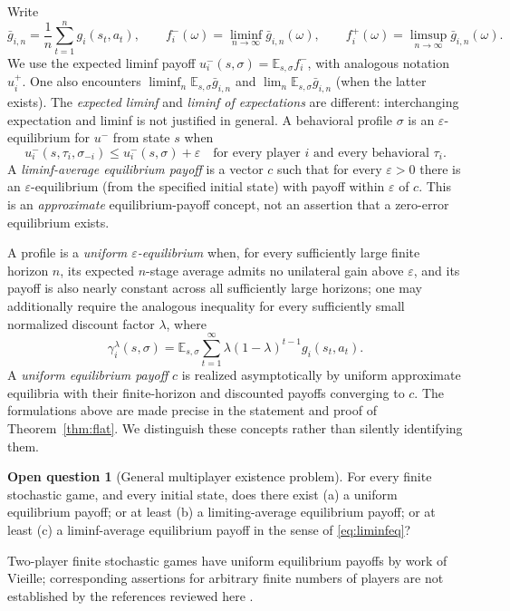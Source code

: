 \documentclass[11pt,a4paper]{article}
\numberwithin{equation}{section}
\theoremstyle{definition}
\newtheorem{question}[theorem]{Open question}
\theoremstyle{remark}
\newcommand{\E}{\mathbb E}
\newcommand{\sig}{\sigma}
\newcommand{\eps}{\varepsilon}
\begin{document}
Write
\[
\bar g_{i,n}=\frac1n\sum_{t=1}^n g_i(s_t,a_t),\qquad
f_i^-(\omega)=\liminf_{n\to\infty}\bar g_{i,n}(\omega),\qquad
f_i^+(\omega)=\limsup_{n\to\infty}\bar g_{i,n}(\omega).
\]
We use the expected liminf payoff
$u_i^-(s,\sig)=\E_{s,\sig}f_i^-$, with analogous notation $u_i^+$.
One also encounters $\liminf_n\E_{s,\sig}\bar g_{i,n}$ and
$\lim_n\E_{s,\sig}\bar g_{i,n}$ (when the latter exists).
The \emph{expected liminf} and \emph{liminf of expectations} are different:
interchanging expectation and liminf is not justified in general.
A behavioral profile $\sig$ is an $\eps$-equilibrium for $u^-$ from state
$s$ when
\begin{equation}\label{eq:liminfeq}
 u_i^-(s,\tau_i,\sig_{-i})\le u_i^-(s,\sig)+\eps
 \quad\text{for every player }i\text{ and every behavioral }\tau_i.
\end{equation}
A \emph{liminf-average equilibrium payoff} is a vector $c$ such that for
every $\eps>0$ there is an $\eps$-equilibrium (from the specified initial
state) with payoff within $\eps$ of $c$. This is an \emph{approximate}
equilibrium-payoff concept, not an assertion that a zero-error equilibrium
exists.

A profile is a \emph{uniform $\eps$-equilibrium} when, for every sufficiently
large finite horizon $n$, its expected $n$-stage average admits no unilateral
gain above $\eps$, and its payoff is also nearly constant across all sufficiently
large horizons; one may additionally require the analogous inequality for every
sufficiently small normalized discount factor $\lambda$, where
\[
\gamma_i^\lambda(s,\sig)
 =\E_{s,\sig}\sum_{t=1}^\infty
 \lambda(1-\lambda)^{t-1}g_i(s_t,a_t).
\]
A \emph{uniform equilibrium payoff} $c$ is realized asymptotically by
uniform approximate equilibria with their finite-horizon and discounted payoffs
converging to $c$. The formulations above are made precise in the statement
and proof of Theorem~\ref{thm:flat}. We distinguish these concepts rather than
silently identifying them.

\begin{question}[General multiplayer existence problem]\label{q:main}
For every finite stochastic game, and every initial state, does there exist
(a) a uniform equilibrium payoff; or at least (b) a limiting-average equilibrium
payoff; or at least (c) a liminf-average equilibrium payoff in the sense of
\eqref{eq:liminfeq}?
\end{question}
Two-player finite stochastic games have uniform equilibrium payoffs by work of
Vieille; corresponding assertions for arbitrary finite numbers of players are
not established by the references reviewed here
\cite{vieille2002,fleschsolan2023,solanvieille2025,aps2026}.
\end{document}
